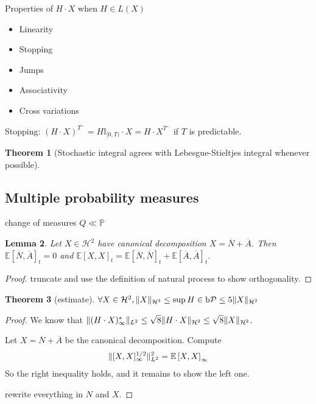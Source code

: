\documentclass[openany,oneside]{book}
\newtheorem{thm}{Theorem}[section]
\newtheorem{lem}[thm]{Lemma}
\theoremstyle{definition}
\theoremstyle{remark}
\newcommand{\E}{\mathbb{E}} %
\renewcommand{\P}{\mathbb{P}} %
\newcommand{\I}{\mathbb{I}} %
\DeclarePairedDelimiter{\norm}{\lVert}{\rVert} %
\newcommand{\sH}[1][2]{\mathcal{H}^{#1}} %
\newcommand{\pred}{\mathcal{P}} %
\newcommand{\bP}{\mathrm{b}\pred} %
\begin{document}
Properties of $H\cdot X$ when $H\in L(X)$
\begin{itemize}
\item Linearity
\item Stopping
\item Jumps
\item Associativity
\item Cross variations
\end{itemize}

Stopping: $(H\cdot X)^{T^-} = H\I_{[0,T)}\cdot X = H\cdot X^{T^-}$ if $T$ is predictable.

\par
\begin{thm}[Stochastic integral agrees with Lebesgue-Stieltjes integral whenever possible]
\end{thm}

\subsection{Multiple probability measures}
change of measures $Q \ll \P$

\begin{lem}
Let $X\in \sH$ have canonical decomposition $X=\overline{N}+\overline{A}$. Then $\E\left[\overline{N},\overline{A}\right]_t = 0$ and $\E\left[X,X\right]_t = \E\left[\overline{N},\overline{N}\right]_t + \E\left[\overline{A},\overline{A}\right]_t$.
\end{lem}
\begin{proof}
truncate and use the definition of natural process to show orthogonality.
\end{proof}

\begin{thm}[estimate]
$\forall X\in \sH, \norm{X}_{\sH} \le \sup{H\in\bP} \le 5\norm{X}_{\sH}$
\end{thm}
\begin{proof}
We know that $\norm{(H\cdot X)^\ast_\infty}_{L^2} \le \sqrt{8} \norm{H\cdot X}_{\sH} \le \sqrt{8}\norm{X}_{\sH}$.
\par
Let $X=\overline{N}+\overline{A}$ be the canonical decomposition. Compute
\begin{align*}
\norm{[X,X]^{1/2}_\infty}^2_{L^2} &= \E\left[X,X\right]_\infty \\
\end{align*}
So the right inequality holds, and it remains to show the left one.
\par
rewrite everything in $N$ and $X$.
\end{proof}
\end{document}
